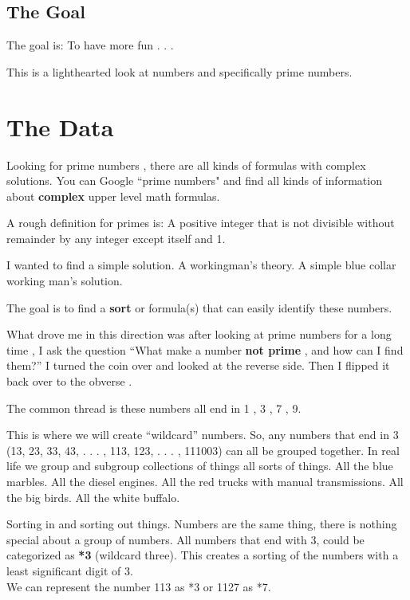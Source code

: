 \documentclass[12pt,letterpaper,oneside,titlepage]{article}
\begin{document}
\subsection{The Goal}
\vspace*{2mm}
\par 
\tab 
The goal is: To have more fun . . . 
\\
\par 
This is a lighthearted look at numbers and specifically prime numbers.



\pagebreak
\section{The Data}

\par
\tab
Looking for prime numbers , there are all kinds of formulas with complex solutions. You can Google ``prime numbers" and find all kinds of information about \textbf{complex} upper level math formulas.
\\
\par A rough definition for primes is: 
A positive integer that is not divisible without remainder by any integer except itself and 1.
\\
\par I wanted to find a simple solution. A working\textendash man's theory. A simple blue collar working man's \mbox{solution}.
\\
\par
The goal is to find a \textbf{sort} or formula(s) that can easily identify these numbers.
\\
\par 
What drove me in this direction was after looking at prime numbers for a long time , I ask the question ``What make a number \textbf{not prime} , and how can I find them?'' I turned the coin over and looked at the reverse side. Then I flipped it back over to the obverse .
\\
\par 
The common thread is these numbers all end in 1 , 3 , 7 , 9.
\\
\par 
This is where we will create ``wild\textendash card'' numbers.  So, any numbers that end
in 3 (13, 23, 33, 43, . . . , 113, 123, . . . , 111003) can all be grouped together.  In
real life we group and sub\textendash group collections of things all sorts of things.
All the blue marbles.  All the diesel engines.  All the red trucks with
manual transmissions.  All the big birds.  All the white buffalo. 
\\
\par
 Sorting in and sorting out things.  Numbers are the same thing, there is nothing
special about a group of numbers.  All numbers that end with 3, could be
categorized as \textbf{*3} (wild\textendash card three).  This creates a sorting of the numbers
with a least significant digit of 3.
\\
We can represent the number 113 as *3 or 1127 as *7.     
\\
\end{document}

